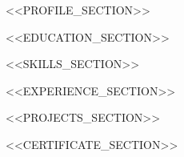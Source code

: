 \documentclass{resume}
\begin{document}
<<PROFILE_SECTION>>

<<EDUCATION_SECTION>>

<<SKILLS_SECTION>>

<<EXPERIENCE_SECTION>>

<<PROJECTS_SECTION>>

<<CERTIFICATE_SECTION>>
\end{document}
